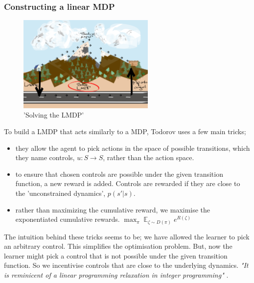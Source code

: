 \subsubsection{Constructing a linear MDP}

\begin{figure}[h!]
  \centering
  \includegraphics[width=0.6\textwidth,height=0.3\textheight]{../../pictures/drawings/abstract-representations-solve.png}
  \caption{'Solving the LMDP'}
\end{figure}

To build a LMDP that acts similarly to a MDP, Todorov \cite{Todorov2006} uses a few main {\color{red}tricks};

\begin{itemize}
\tightlist
  \item
  they allow the agent to pick actions in the space of possible transitions, which they name controls, $u: S \to S$, rather than the action space.
  \item
  to ensure that chosen controls are possible under the given transition function, a new reward is added.
  Controls are rewarded if they are close to the 'unconstrained dynamics', $p(s' | s)$.
  \item
  rather than maximizing the cumulative reward, we maximise the exponentiated cumulative rewards.
  $\mathop{\text{max}}_{\pi} \mathop{\mathbb E}_{\zeta \sim D(\pi)} e^{R(\zeta)}$ \cite{EricWarrenFox2016}
\end{itemize}

The intuition behind these tricks seems to be; we have allowed the learner to pick an arbitrary control.
This simplifies the optimisation problem. But, now the learner might pick a control that is not possible
under the given transition function. So we incentivise controls that are close to the underlying dynamics.
\textit{"It is reminicent of a linear programming relaxation in integer programming"} \cite{Todorov2009}.


